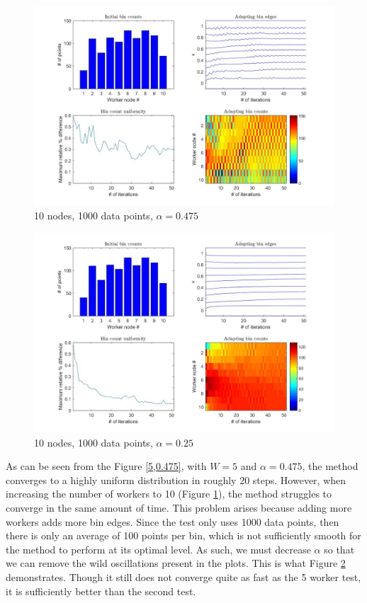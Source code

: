 \documentclass{article}
\begin{document}
\begin{figure}[!htb]
	\centering
	\vspace{-5pt}
	\includegraphics[scale = 0.25]{AdaptiveBinning_10Nodes_1000Lines_0475alpha}
	\vspace{-10pt}
	\caption{10 nodes, 1000 data points, $\alpha = 0.475$}
	\label{10,0.475}
\end{figure}
\begin{figure}[!htb]
	\centering
	\vspace{-5pt}
	\includegraphics[scale = 0.25]{AdaptiveBinning_10Nodes_1000Lines_0250alpha}
	\vspace{-10pt}
	\caption{10 nodes, 1000 data points, $\alpha = 0.25$}
	\label{10,0.250}
\end{figure}

As can be seen from the Figure \ref{5,0.475}, with $W=5$ and $\alpha=0.475$, the method converges to a highly uniform distribution in roughly 20 steps. However, when increasing the number of workers to 10 (Figure \ref{10,0.475}), the method struggles to converge in the same amount of time. This problem arises because adding more workers adds more bin edges. Since the test only uses 1000 data points, then there is only an average of 100 points per bin, which is not sufficiently smooth for the method to perform at its optimal level. As such, we must decrease $\alpha$ so that we can remove the wild oscillations present in the plots. This is what Figure \ref{10,0.250} demonstrates. Though it still does not converge quite as fast as the 5 worker test, it is sufficiently better than the second test.
\end{document}
